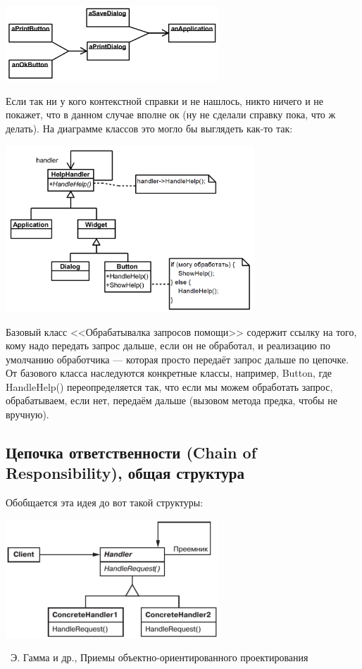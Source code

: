 \documentclass[a5paper]{article}
\newcommand{\attribution}[1] {
    \vspace{-5mm}\begin{flushright}\begin{scriptsize}%
    {\textcopyright\, #1}\end{scriptsize}\end{flushright}
}
\begin{document}
\begin{center}
    \includegraphics[width=0.6\textwidth]{chainOfResponsibilityExample.png}
\end{center}

Если так ни у кого контекстной справки и не нашлось, никто ничего и не покажет, что в данном случае вполне ок (ну не сделали справку пока, что ж делать). На диаграмме классов это могло бы выглядеть как-то так:

\begin{center}
    \includegraphics[width=0.7\textwidth]{chainOfResponsibilityExampleClasses.png}
\end{center}

Базовый класс <<Обрабатывалка запросов помощи>> содержит ссылку на того, кому надо передать запрос дальше, если он не обработал, и реализацию по умолчанию обработчика --- которая просто передаёт запрос дальше по цепочке. От базового класса наследуются конкретные классы, например, Button, где HandleHelp() переопределяется так, что если мы можем обработать запрос, обрабатываем, если нет, передаём дальше (вызовом метода предка, чтобы не вручную).

\subsection{Цепочка ответственности (Chain of Responsibility), общая структура}

Обобщается эта идея до вот такой структуры:

\begin{center}
    \includegraphics[width=0.6\textwidth]{chainOfResponsibility.png}
    \attribution{Э. Гамма и др., Приемы объектно-ориентированного проектирования}
\end{center}
\end{document}
